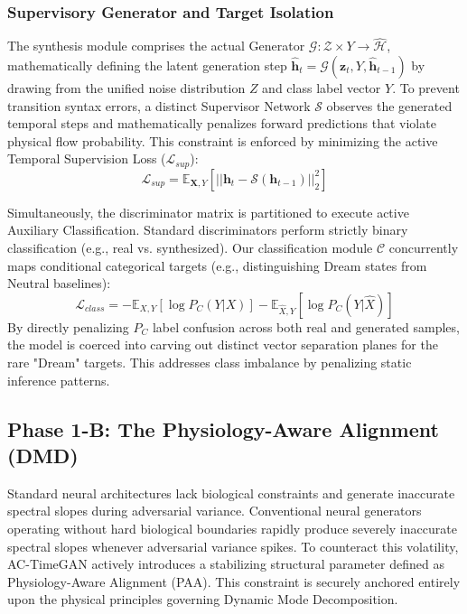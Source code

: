 \documentclass[journal]{IEEEtran}
\begin{document}
\subsubsection{Supervisory Generator and Target Isolation}
The synthesis module comprises the actual Generator $\mathcal{G}: \mathcal{Z} \times Y \rightarrow \hat{\mathcal{H}}$, mathematically defining the latent generation step $\hat{\mathbf{h}}_t = \mathcal{G}(\mathbf{z}_t, Y, \hat{\mathbf{h}}_{t-1})$ by drawing from the unified noise distribution $Z$ and class label vector $Y$. To prevent transition syntax errors, a distinct Supervisor Network $\mathcal{S}$ observes the generated temporal steps and mathematically penalizes forward predictions that violate physical flow probability. This constraint is enforced by minimizing the active Temporal Supervision Loss ($\mathcal{L}_{sup}$):
\begin{equation}
    \mathcal{L}_{sup} = \mathbb{E}_{\mathbf{X}, Y} \left[ || \mathbf{h}_t - \mathcal{S}(\mathbf{h}_{t-1}) ||_2^2 \right]
\end{equation}

Simultaneously, the discriminator matrix is partitioned to execute active Auxiliary Classification. Standard discriminators perform strictly binary classification (e.g., real vs. synthesized). Our classification module $\mathcal{C}$ concurrently maps conditional categorical targets (e.g., distinguishing Dream states from Neutral baselines):
\begin{equation}
    \mathcal{L}_{class} = - \mathbb{E}_{X,Y}[\log P_C(Y|X)] - \mathbb{E}_{\hat{X},Y}[\log P_C(Y|\hat{X})]
\end{equation}
By directly penalizing $P_C$ label confusion across both real and generated samples, the model is coerced into carving out distinct vector separation planes for the rare "Dream" targets. This addresses class imbalance by penalizing static inference patterns.

\subsection{Phase 1-B: The Physiology-Aware Alignment (DMD)}
Standard neural architectures lack biological constraints and generate inaccurate spectral slopes during adversarial variance. Conventional neural generators operating without hard biological boundaries rapidly produce severely inaccurate spectral slopes whenever adversarial variance spikes. To counteract this volatility, AC-TimeGAN actively introduces a stabilizing structural parameter defined as Physiology-Aware Alignment (PAA). This constraint is securely anchored entirely upon the physical principles governing Dynamic Mode Decomposition.
\end{document}
